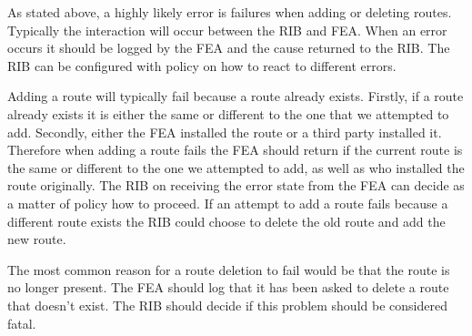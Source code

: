 \documentclass[11pt]{article}
\begin{document}
As stated above, a highly likely error is failures when adding or
deleting routes. Typically the interaction will occur between the RIB
and FEA. When an error occurs it should be logged by the FEA and the
cause returned to the RIB. The RIB can be configured with policy on
how to react to different errors.

Adding a route will typically fail because a route already exists.
Firstly, if a route already exists it is either the same or different
to the one that we attempted to add. Secondly, either the FEA
installed the route or a third party installed it. Therefore when
adding a route fails the FEA should return if the current route is the
same or different to the one we attempted to add, as well as who
installed the route originally. The RIB on receiving the error state
from the FEA can decide as a matter of policy how to proceed. If an
attempt to add a route fails because a different route exists the RIB
could choose to delete the old route and add the new route.

The most common reason for a route deletion to fail would be that the
route is no longer present. The FEA should log that it has been asked
to delete a route that doesn't exist. The RIB should decide if this
problem should be considered fatal.





\end{document}
